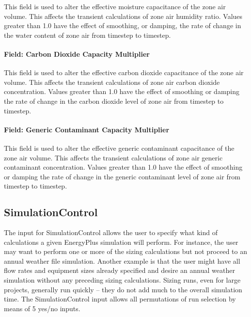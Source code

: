 This field is used to alter the effective moisture capacitance of the zone air volume. This affects the transient calculations of zone air humidity ratio. Values greater than 1.0 have the effect of smoothing, or damping, the rate of change in the water content of zone air from timestep to timestep.

\paragraph{Field: Carbon Dioxide Capacity Multiplier}\label{field-carbon-dioxide-capacity-multiplier}

This field is used to alter the effective carbon dioxide capacitance of the zone air volume. This affects the transient calculations of zone air carbon dioxide concentration. Values greater than 1.0 have the effect of smoothing or damping the rate of change in the carbon dioxide level of zone air from timestep to timestep.

\paragraph{Field: Generic Contaminant Capacity Multiplier}\label{field-generic-contaminant-capacity-multiplier}

This field is used to alter the effective generic contaminant capacitance of the zone air volume. This affects the transient calculations of zone air generic contaminant concentration. Values greater than 1.0 have the effect of smoothing or damping the rate of change in the generic contaminant level of zone air from timestep to timestep.

\subsection{SimulationControl}\label{simulationcontrol}

The input for SimulationControl allows the user to specify what kind of calculations a given EnergyPlus simulation will perform. For instance, the user may want to perform one or more of the sizing calculations but not proceed to an annual weather file simulation. Another example is that the user might have all flow rates and equipment sizes already specified and desire an annual weather simulation without any preceding sizing calculations. Sizing runs, even for large projects, generally run quickly -- they do not add much to the overall simulation time. The SimulationControl input allows all permutations of run selection by means of 5 yes/no inputs.


